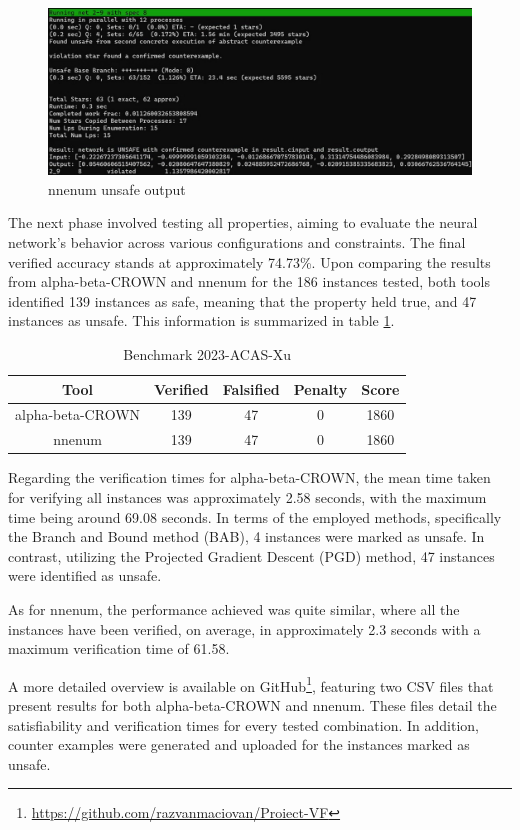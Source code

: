 \begin{figure}[htbp]
	\centering
		\includegraphics[width=14cm]{./Figures/nnenum_ex.png}
	\caption{nnenum unsafe output}
	\label{Fig_Out1}
\end{figure}

The next phase involved testing all properties, aiming to evaluate the neural network’s behavior across various configurations and constraints. The final verified accuracy stands at approximately 74.73\%. Upon comparing the results from alpha-beta-CROWN and nnenum for the 186 instances tested, both tools identified 139 instances as safe, meaning that the property held true, and 47 instances as unsafe. This information is summarized in table \ref{table:1}.

\begin{table}[h!]
\centering
\begin{tabular}{ |c c c c c| } 
\hline
Tool & Verified & Falsified & Penalty & Score \\
\hline
alpha-beta-CROWN & 139 & 47 & 0 & 1860 \\ 
nnenum & 139 & 47 & 0 & 1860 \\ 
\hline
\end{tabular}
\caption{Benchmark 2023-ACAS-Xu}
\label{table:1}
\end{table}

Regarding the verification times for alpha-beta-CROWN, the mean time taken for verifying all instances was approximately 2.58 seconds, with the maximum time being around 69.08 seconds. In terms of the employed methods, specifically the Branch and Bound method (BAB), 4 instances were marked as unsafe. In contrast, utilizing the Projected Gradient Descent (PGD) method, 47 instances were identified as unsafe.

As for nnenum, the performance achieved was quite similar, where all the instances have been verified, on average, in approximately 2.3 seconds with a maximum verification time of 61.58.

A more detailed overview is available on GitHub\footnote{\url{https://github.com/razvanmaciovan/Proiect-VF}}, featuring two CSV files that present results for both alpha-beta-CROWN and nnenum. These files detail the satisfiability and verification times for every tested combination. In addition, counter examples were generated and uploaded for the instances marked as unsafe.